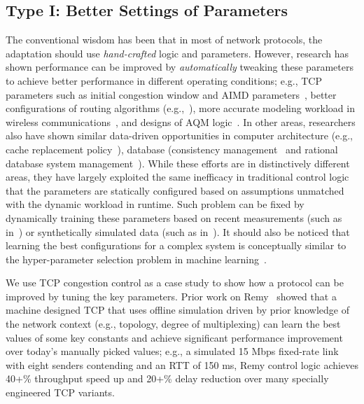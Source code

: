 \subsection{Type I: Better Settings of Parameters}

The conventional wisdom has been that in most of network protocols, 
the adaptation should use {\em hand-crafted} logic and parameters. 
However, research has shown performance
can be improved by {\em automatically} tweaking these parameters 
to achieve better performance in different operating conditions;
e.g., TCP parameters such as initial congestion window and AIMD 
parameters~\cite{remy,googleinitwindow}, 
better configurations of routing algorithms 
(e.g.,~\cite{sharma2017machine}),
more accurate modeling workload in wireless 
communications~\cite{alsheikh2014machine},
and designs of AQM logic~\cite{shah2016sam,lin2015kemy}.
In other areas, researchers also have shown
similar data-driven opportunities in computer architecture
(e.g., cache replacement policy~\cite{calvinlin-cache}),
database (consistency management~\cite{aaron-cidr} and 
rational database system management~\cite{andypavlo-rbsm}).
While these efforts are in distinctively different areas,
they have largely exploited the same inefficacy in traditional
control logic that the parameters are statically configured 
based on assumptions unmatched with the dynamic workload 
in runtime. 
Such problem can be fixed by dynamically training
these parameters based on recent measurements
(such as in~\cite{calvinlin-cache}) or
synthetically simulated data (such as in~\cite{remy}).
It should also be noticed that learning the best configurations
for a complex system is conceptually similar to the 
hyper-parameter selection problem in machine learning~\cite{ml101}.

\noindent\underline{}
We use TCP congestion control as a case study to show
how a protocol can be improved by tuning the key parameters.
Prior work on Remy~\cite{remy} showed that a machine 
designed TCP that uses offline simulation driven by prior 
knowledge of the network context (e.g., topology, degree of
multiplexing) can learn the best values of some key 
constants and achieve significant performance improvement 
over today’s manually picked values; e.g., a simulated 15 
Mbps fixed-rate link with eight senders contending and an 
RTT of 150 ms, Remy control logic achieves 40+\% throughput
speed up and 20+\% delay reduction over many specially 
engineered TCP variants.


